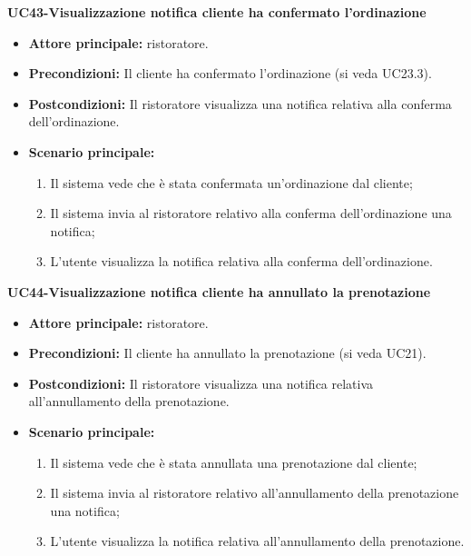 \textbf{UC43-Visualizzazione notifica cliente ha confermato l'ordinazione}
\begin{itemize}
\item \textbf{Attore principale:} ristoratore.
\item \textbf{Precondizioni:} Il cliente ha confermato l'ordinazione (si veda UC23.3).
\item \textbf{Postcondizioni:} Il ristoratore visualizza una notifica relativa alla conferma dell'ordinazione.
\item \textbf{Scenario principale:}
\begin{enumerate}
    \item Il sistema vede che è stata confermata un'ordinazione dal cliente;
    \item Il sistema invia al ristoratore relativo alla conferma dell'ordinazione una notifica;
    \item L'utente visualizza la notifica relativa alla conferma dell'ordinazione.
\end{enumerate}
\end{itemize}

\textbf{UC44-Visualizzazione notifica cliente ha annullato la prenotazione}
\begin{itemize}
\item \textbf{Attore principale:} ristoratore.
\item \textbf{Precondizioni:} Il cliente ha annullato la prenotazione (si veda UC21).
\item \textbf{Postcondizioni:} Il ristoratore visualizza una notifica relativa all'annullamento della prenotazione.
\item \textbf{Scenario principale:}
\begin{enumerate}
    \item Il sistema vede che è stata annullata una prenotazione dal cliente;
    \item Il sistema invia al ristoratore relativo all'annullamento della prenotazione una notifica;
    \item L'utente visualizza la notifica relativa all'annullamento della prenotazione.
\end{enumerate}
\end{itemize}

